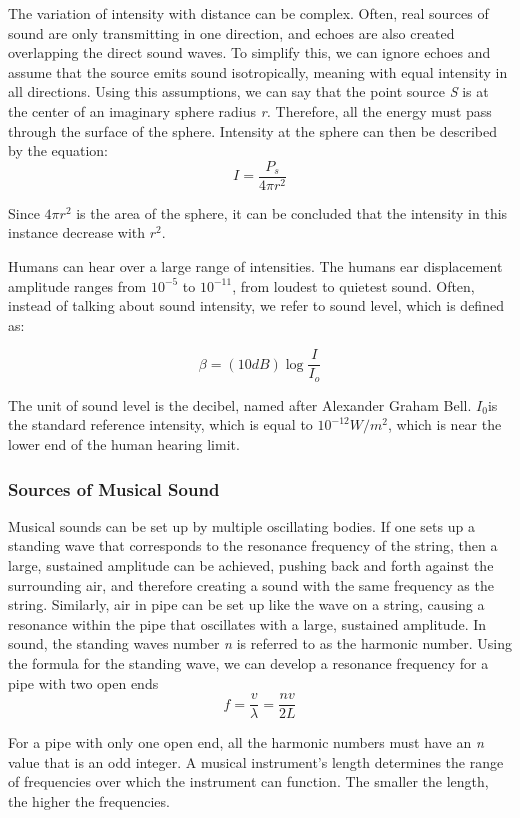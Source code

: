 \documentclass[english]{article}
\begin{document}
The variation of intensity with distance can be complex. Often, real
sources of sound are only transmitting in one direction, and echoes
are also created overlapping the direct sound waves. To simplify this,
we can ignore echoes and assume that the source emits sound isotropically,
meaning with equal intensity in all directions. Using this assumptions,
we can say that the point source \emph{S }is at the center of an imaginary
sphere radius \emph{r. }Therefore, all the energy must pass through
the surface of the sphere. Intensity at the sphere can then be described
by the equation:
\[
I=\frac{P_{s}}{4\pi r^{2}}
\]


Since $4\pi r^{2}$ is the area of the sphere, it can be concluded
that the intensity in this instance decrease with $r^{2}$.

Humans can hear over a large range of intensities. The humans ear
displacement amplitude ranges from $10^{-5}$ to $10^{-11}$, from
loudest to quietest sound. Often, instead of talking about sound intensity,
we refer to sound level, which is defined as:

\[
\beta=(10dB)\log\frac{I}{I_{o}}
\]


The unit of sound level is the decibel, named after Alexander Graham
Bell. $I_{0}$is the standard reference intensity, which is equal
to $10^{-12}W/m^{2}$, which is near the lower end of the human hearing
limit.


\subsubsection*{Sources of Musical Sound}

Musical sounds can be set up by multiple oscillating bodies. If one
sets up a standing wave that corresponds to the resonance frequency
of the string, then a large, sustained amplitude can be achieved,
pushing back and forth against the surrounding air, and therefore
creating a sound with the same frequency as the string. Similarly,
air in pipe can be set up like the wave on a string, causing a resonance
within the pipe that oscillates with a large, sustained amplitude.
In sound, the standing waves number \emph{n }is referred to as the
harmonic number. Using the formula for the standing wave, we can develop
a resonance frequency for a pipe with two open ends
\[
f=\frac{v}{\lambda}=\frac{nv}{2L}
\]


For a pipe with only one open end, all the harmonic numbers must have
an \emph{n }value that is an odd integer. A musical instrument's length
determines the range of frequencies over which the instrument can
function. The smaller the length, the higher the frequencies.
\end{document}
